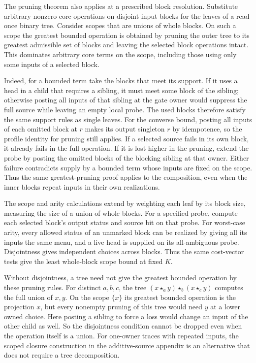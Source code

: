 The pruning theorem also applies at a prescribed block
resolution. Substitute arbitrary nonzero core operations
on disjoint input blocks for the leaves of a read-once
binary tree. Consider scopes that are unions of whole
blocks. On such a scope the greatest bounded operation
is obtained by pruning the outer tree to its greatest
admissible set of blocks and leaving the selected block
operations intact. This dominates arbitrary core terms
on the scope, including those using only some inputs of
a selected block.

Indeed, for a bounded term take the blocks that meet its
support. If it uses a head in a child that requires a
sibling, it must meet some block of the sibling; otherwise
posting all inputs of that sibling at the gate owner
would suppress the full source while leaving an empty
local probe. The used blocks therefore satisfy the same
support rules as single leaves. For the converse bound,
posting all inputs of each omitted block at $r$ makes
its output singleton $r$ by idempotence, so the profile
identity for pruning still applies. If a selected source
fails in its own block, it already fails in the full
operation. If it is lost higher in the pruning, extend
the probe by posting the omitted blocks of the blocking
sibling at that owner. Either failure contradicts supply
by a bounded term whose inputs are fixed on the scope.
Thus the same greatest-pruning proof applies to the
composition, even when the inner blocks repeat inputs
in their own realizations.

The scope and arity calculations extend by weighting
each leaf by its block size, measuring the size of a
union of whole blocks. For a specified probe, compute
each selected block's output status and source bit on
that probe. For worst-case arity, every allowed status
of an unmarked block can be realized by giving all its
inputs the same menu, and a live head is supplied on
its all-ambiguous probe. Disjointness gives independent
choices across blocks. Thus the same cost-vector tests
give the least whole-block scope bound at fixed $K$.

Without disjointness, a tree need not give the greatest
bounded operation by these pruning rules. For distinct
$a,b,c$, the tree $(x\star_a y)\star_b(x\star_c y)$ computes
the full union of $x,y$. On the scope $\{x\}$ its greatest
bounded operation is the projection $x$, but every nonempty
pruning of this tree would need $y$ at a lower owned choice.
Here posting a sibling to force a loss would change an input
of the other child as well. So the disjointness condition
cannot be dropped even when the operation itself is a union.
For one-owner traces with repeated inputs, the scoped
closure construction in the additive-source appendix is an
alternative that does not require a tree decomposition.

